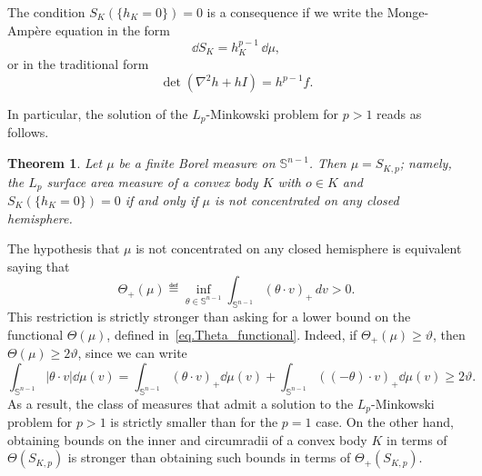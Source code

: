 \documentclass[a4paper, 10pt, twoside]{amsart}
\numberwithin{equation}{section}
\newcommand{\theoname}{Theorem}
\theoremstyle{plain}
\newtheorem{theorem}{\theoname}[section]
\theoremstyle{definition}
\begin{document}
 The condition $S_K(\{h_K=0\})=0$ is a consequence if we write the Monge-Amp\`ere equation in the form
$$
\dd S_K=h_K^{p-1}\,\dd \mu,
$$
or in the traditional form
$$
\det(\nabla^2 h+hI)=h^{p-1}f.
$$

In particular, the solution of the $L_p$-Minkowski problem for $p>1$ reads as follows. 

\begin{theorem}\label{thm.existence_Minko_Lp}
Let $\mu$ be a finite Borel measure on $\mathbb{S}^{n-1}$. Then $\mu=S_{K,p}$; namely, the $L_p$ surface area measure of a convex body $K$ with $o\in K$ and $S_K(\{h_K=0\})=0$ if and only if $\mu$ is not concentrated on any closed hemisphere.
\end{theorem}


The hypothesis that $\mu$ is not concentrated on any closed hemisphere is equivalent saying that
\begin{equation}\label{eq.Theta_plus}
    \Theta_+(\mu) 
    \eqdef 
    \inf_{\theta \in \mathbb{S}^{n-1}}\int_{\mathbb{S}^{n-1}}{(\theta\cdot v)}_+\,dv>0.
\end{equation}
This restriction is strictly stronger than asking for a lower bound on the functional $\Theta(\mu)$, defined in~\eqref{eq.Theta_functional}. Indeed, if $\Theta_+(\mu) \ge \vartheta$, then $\Theta(\mu) \ge 2\vartheta$, since we can write 
\[
    \int_{\mathbb{S}^{n-1}} |\theta \cdot v| \dd \mu(v)
    = 
    \int_{\mathbb{S}^{n-1}} {(\theta \cdot v)}_+ \dd \mu(v)
    + 
    \int_{\mathbb{S}^{n-1}} {((-\theta) \cdot v)}_+ \dd \mu(v) 
    \ge 2\vartheta.
\]
As a result, the class of measures that admit a solution to the $L_p$-Minkowski problem for $p>1$ is strictly smaller than for the $p = 1$ case. On the other hand, obtaining bounds on the inner and circumradii of a convex body $K$ in terms of $\Theta(S_{K,p})$ is stronger than obtaining such bounds in terms of $\Theta_+(S_{K,p})$.
\end{document}
